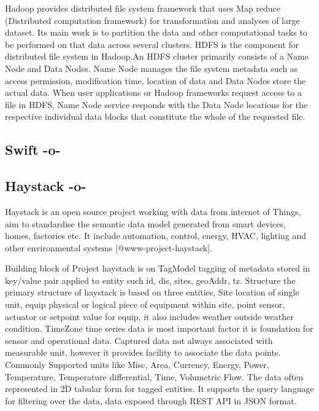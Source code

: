 Hadoop provides distributed file system framework that uses Map reduce
(Distributed computation framework) for transformation and analyses of
large dataset.  Its main work is to partition the data and other
computational tasks to be performed on that data across several
clusters.  HDFS is the component for distributed file system in
Hadoop.An HDFS cluster primarily consists of a Name Node and Data
Nodes. Name Node manages the file system metadata such as access
permission, modification time, location of data and Data Nodes store
the actual data.  When user applications or Hadoop frameworks request
access to a file in HDFS, Name Node service responds with the Data
Node locations for the respective individual data blocks that
constitute the whole of the requested file\cite{www-hdfs}.

\subsection{Swift -o-}



\subsection{Haystack -o-}

Haystack is an open source project working with data from internet of
Things, aim to standardise the semantic data model generated from
smart devices, homes, factories etc.  It include automation, control,
energy, HVAC, lighting and other environmental systems
 [@www-project-haystack].
     
Building block of Project haystack is on TagModel tagging of metadata
stored in key/value pair applied to entity such id, dis, sites,
geoAddr, tz. Structure the primary structure of haystack is based on
three entities, Site location of single unit, equip physical or
logical piece of equipment within site, point sensor, actuator or
setpoint value for equip, it also includes weather outside weather
condition. TimeZone time series data is most important factor it is
foundation for sensor and operational data. Captured data not always
associated with measurable unit, however it provides facility to
associate the data points.  Commonly Supported units like Misc, Area,
Currency, Energy, Power, Temperature, Temperature differential, Time,
Volumetric Flow. The data often represented in 2D tabular form for
tagged entities. It supports the query language for filtering over the
data, data exposed through REST API in JSON format.



